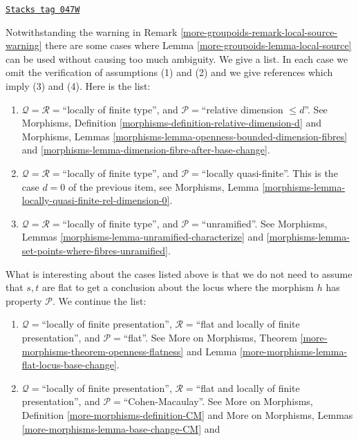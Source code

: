 \begin{remark}
\label{more-groupoids-remark-local-source-apply}
\href{https://stacks.math.columbia.edu/tag/047W}{\texttt{Stacks tag 047W}}

Notwithstanding the warning in
Remark \ref{more-groupoids-remark-local-source-warning}
there are some cases where
Lemma \ref{more-groupoids-lemma-local-source}
can be used without causing too much ambiguity.
We give a list. In each case we omit the verification of
assumptions (1) and (2) and we give references which imply
(3) and (4). Here is the list:
\begin{enumerate}
\item $\mathcal{Q} = \mathcal{R} =$``locally of finite type'', and
$\mathcal{P} =$``relative dimension $\leq d$''.
See
Morphisms, Definition \ref{morphisms-definition-relative-dimension-d}
and
Morphisms, Lemmas \ref{morphisms-lemma-openness-bounded-dimension-fibres} and
\ref{morphisms-lemma-dimension-fibre-after-base-change}.
\item $\mathcal{Q} = \mathcal{R} =$``locally of finite type'', and
$\mathcal{P} =$``locally quasi-finite''.
This is the case $d = 0$ of the previous item, see
Morphisms, Lemma \ref{morphisms-lemma-locally-quasi-finite-rel-dimension-0}.
\item $\mathcal{Q} = \mathcal{R} =$``locally of finite type'', and
$\mathcal{P} =$``unramified''.
See
Morphisms, Lemmas \ref{morphisms-lemma-unramified-characterize} and
\ref{morphisms-lemma-set-points-where-fibres-unramified}.
\end{enumerate}
What is interesting about the cases listed above is that we do not
need to assume that $s, t$ are flat to get a conclusion about the locus
where the morphism $h$ has property $\mathcal{P}$. We continue the
list:
\begin{enumerate}
\item[(4)] $\mathcal{Q} =$``locally of finite presentation'',
$\mathcal{R} =$``flat and locally of finite presentation'', and
$\mathcal{P} =$``flat''. See
More on Morphisms, Theorem
\ref{more-morphisms-theorem-openness-flatness} and
Lemma \ref{more-morphisms-lemma-flat-locus-base-change}.
\item[(5)] $\mathcal{Q} =$``locally of finite presentation'',
$\mathcal{R} =$``flat and locally of finite presentation'', and
$\mathcal{P}=$``Cohen-Macaulay''. See
More on Morphisms, Definition \ref{more-morphisms-definition-CM}
and
More on Morphisms, Lemmas \ref{more-morphisms-lemma-base-change-CM} and

\end{enumerate}
\end{remark}
